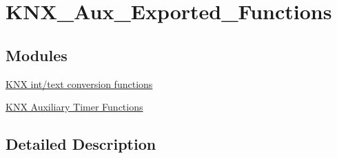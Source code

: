 \hypertarget{group___k_n_x___aux___exported___functions}{}\section{K\+N\+X\+\_\+\+Aux\+\_\+\+Exported\+\_\+\+Functions}
\label{group___k_n_x___aux___exported___functions}
\subsection*{Modules}
\begin{DoxyCompactItemize}
\item 
\hyperlink{group___k_n_x___aux___exported___functions___group1}{K\+N\+X int/text conversion functions}
\item 
\hyperlink{group___k_n_x___aux___exported___functions___group2}{K\+N\+X Auxiliary Timer Functions}
\end{DoxyCompactItemize}


\subsection{Detailed Description}
